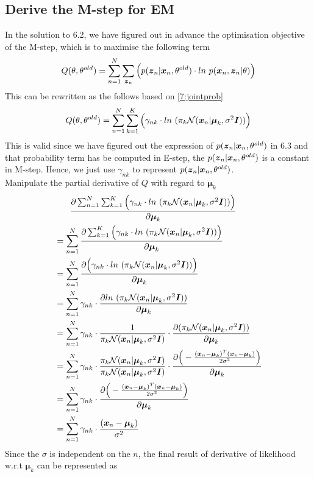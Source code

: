 \documentclass[11pt,a4paper]{article}
\newcommand{\htab}{\hspace*{0.63cm}}
\newcommand{\bmu}{\boldsymbol{\mu}}
\begin{document}
\subsection{Derive the M-step for EM}
\htab In the solution to 6.2, we have figured out in advance the optimisation objective of the M-step, 
which is to maximise the following term
\begin{align}
    Q(\theta, \theta^{old}) = \sum_{n=1}^{N}  \sum_{\boldsymbol{z}_{n}} \Big(p(\boldsymbol{z}_{n} | \boldsymbol{x}_{n}, \theta^{old}) 
        \cdot ln\ p (\boldsymbol{x}_{n}, \boldsymbol{z}_{n} | \theta) \Big)
    \end{align}
\htab This can be rewritten as the follows based on \eqref{7:jointprob}
\begin{align}
    Q(\theta, \theta^{old}) = \sumn  \sumk \Big( \gamma_{nk} \cdot ln\ ( \pk \Nxn) \Big)
    \end{align}
\htab This is valid since we have figured out the expression of $p(\boldsymbol{z}_{n} | \boldsymbol{x}_{n}, \theta^{old})$ in 6.3 and that 
probability term has be computed in E-step, the $p(\boldsymbol{z}_{n} | \boldsymbol{x}_{n}, \theta^{old})$ is a constant in M-step. 
Hence, we just use $\gamma_{nk}$ to represent $p(\boldsymbol{z}_{n} | \boldsymbol{x}_{n}, \theta^{old})$. \\
\htab Manipulate the partial derivative of $Q$ with regard to $\bmu_{k}$
    \begin{align}
        &\htab \frac {\partial \sumn  \sumk \Big( \gamma_{nk} \cdot ln\ ( \pk \Nxn) \Big)}
        {\partial \bmu_{k}}  \\
        &=\sumn  \frac { \partial  \sumk \Big( \gamma_{nk} \cdot ln\ ( \pk \Nxn) \Big)}
        {\partial \bmu_{k}}  \\
        &=\sumn \frac {  \partial \Big( \gamma_{nk} \cdot ln\ ( \pk \Nxn) \Big)}
        {\partial \bmu_{k}}  \\
        &=\sumn  \gamma_{nk} \cdot \frac {  \partial ln\ ( \pk \Nxn) }
        {\partial \bmu_{k}}  \\
        &=\sumn  \gamma_{nk} \cdot \frac{1}{\pk \Nxn} \cdot \frac {  \partial ( \pk \Nxn) }
        {\partial \bmu_{k}}  \\
        &=\sumn  \gamma_{nk} \cdot \frac{\pk \Nxn}{\pk \Nxn} \cdot \frac {\partial \Big( \quadratic \Big)}
        {\partial \bmu_{k}}  \\
        &=\sumn  \gamma_{nk}  \cdot \frac {\partial \Big( \quadratic \Big)}
        {\partial \bmu_{k}}  \\
        &=\sumn  \gamma_{nk}  \cdot  \diffquadratic
     \end{align} 
\htab Since the $\sigma$ is independent on the $n$, the final result of derivative of likelihood w.r.t $\bmu_{k}$ can be represented as
\end{document}
